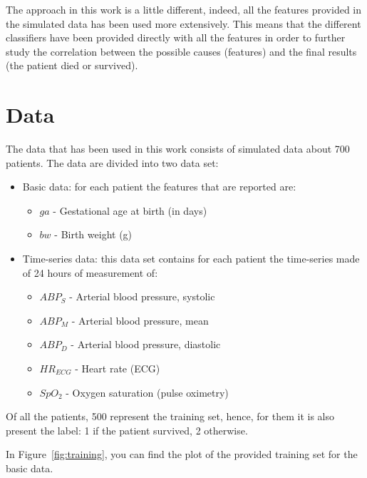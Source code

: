 \documentclass[a4paper,11pt]{article}
\begin{document}
The approach in this work is a little different, indeed, all the features provided in the simulated data has been used more extensively. This means that the different classifiers have been provided directly with all the features in order to further study the correlation between the possible causes (features) and the final results (the patient died or survived).

\section{Data} %
The data that has been used in this work consists of simulated data about 700 patients. The data are divided into two data set:
\begin{itemize}
    \item Basic data: for each patient the features that are reported are:
    \begin{itemize}
        \item $ga$ - Gestational age at birth (in days)
        \item $bw$ - Birth weight (g)
    \end{itemize}
    \item Time-series data: this data set contains for each patient the time-series made of 24 hours of measurement of:
    \begin{itemize}
        \item $ABP_S$ - Arterial blood pressure, systolic
        \item $ABP_M$ - Arterial blood pressure, mean
        \item $ABP_D$ - Arterial blood pressure, diastolic
        \item $HR_{ECG}$ - Heart rate (ECG)
        \item $SpO_2$ - Oxygen saturation (pulse oximetry)
    \end{itemize}
\end{itemize}
Of all the patients, 500 represent the training set, hence, for them it is also present the label: 1 if the patient survived, 2 otherwise.

In Figure~\ref{fig:training}, you can find the plot of the provided training set for the basic data.
\end{document}
